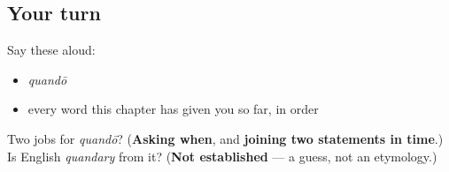 \subsection*{Your turn}
Say these aloud:

\begin{itemize}
\raggedright
  \item \emph{quandō}
  \item every word this chapter has given you so far, in order
\end{itemize}

\begin{tcolorbox}[breakable,colback=teal!4,colframe=teal!35!black,title={Before you move on}]
Two jobs for \emph{quandō}? (\textbf{Asking when}, and \textbf{joining two statements in time}.) Is English \emph{quandary} from it? (\textbf{Not established} — a guess, not an etymology.)
\end{tcolorbox}
